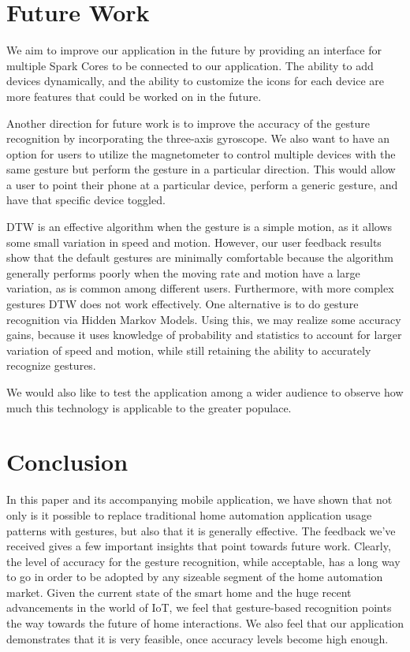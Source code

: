 \documentclass[journal]{IEEEtran}
\begin{document}
\section{Future Work}
We aim to improve our application in the future by providing an interface for multiple Spark Cores to be connected to our application. The ability to add devices dynamically, and the ability to customize the icons for each device are more features that could be worked on in the future.

Another direction for future work is to improve the accuracy of the gesture recognition by incorporating the three-axis gyroscope. We also want to have an option for users to utilize the magnetometer to control multiple devices with the same gesture but perform the gesture in a particular direction. This would allow a user to point their phone at a particular device, perform a generic gesture, and have that specific device toggled.

DTW is an effective algorithm when the gesture is a simple motion, as it allows some small variation in speed and motion. However, our user feedback results show that the default gestures are minimally comfortable because the algorithm generally performs poorly when the moving rate and motion have a large variation, as is common among different users. Furthermore, with more complex gestures DTW does not work effectively. One alternative is to do gesture recognition via Hidden Markov Models. Using this, we may realize some accuracy gains, because it uses knowledge of probability and statistics to account for larger variation of speed and motion, while still retaining the ability to accurately recognize gestures. 

We would also like to test the application among a wider audience to observe how much this technology is applicable to the greater populace.
\section{Conclusion}

In this paper and its accompanying mobile application, we have shown that not only is it possible to replace traditional home automation application usage patterns with gestures, but also that it is generally effective. The feedback we’ve received gives a few important insights that point towards future work. Clearly, the level of accuracy for the gesture recognition, while acceptable, has a long way to go in order to be adopted by any sizeable segment of the home automation market. Given the current state of the smart home and the huge recent advancements in the world of IoT, we feel that gesture-based recognition points the way towards the future of home interactions. We also feel that our application demonstrates that it is very feasible, once accuracy levels become high enough. 
\end{document}
